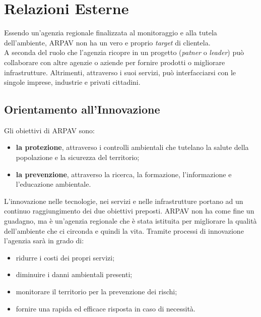 \section{Relazioni Esterne}


Essendo un'agenzia regionale finalizzata al monitoraggio e alla tutela dell'ambiente, ARPAV non ha un vero e proprio \textit{target} di clientela. \\
A seconda del ruolo che l'agenzia ricopre in un progetto (\textit{patner} o \textit{leader}) può collaborare con altre agenzie o aziende per fornire prodotti o migliorare infrastrutture. Altrimenti, attraverso i suoi servizi, può interfacciarsi con le singole imprese, industrie e  privati cittadini. 

\subsection{Orientamento all'Innovazione}
Gli obiettivi di ARPAV sono:
\begin{itemize}
	
\item    \textbf{la protezione}, attraverso i controlli ambientali che tutelano la salute della popolazione e la sicurezza del territorio;
\item \textbf{la prevenzione}, attraverso la ricerca, la formazione, l'informazione e l'educazione ambientale.
\end{itemize} 

L'innovazione nelle tecnologie, nei servizi e nelle infrastrutture portano ad un continuo raggiungimento dei due obiettivi preposti. ARPAV non ha come fine un guadagno, ma è un'agenzia regionale che è stata istituita per migliorare la qualità dell'ambiente che ci circonda e quindi la vita. Tramite processi di innovazione l'agenzia sarà in grado di: 
\begin{itemize}
	\item ridurre i costi dei propri servizi;
	\item diminuire i danni ambientali presenti;
	\item monitorare il territorio per la prevenzione dei rischi;
	\item fornire una rapida ed efficace risposta in caso di necessità.
	
\end{itemize}

